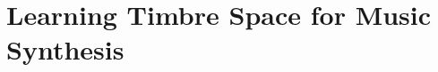 
\graphicspath{{5-synthesis/figures/}}

\chapter{Learning Timbre Space for Music Synthesis}
\label{ch:synthesis}
